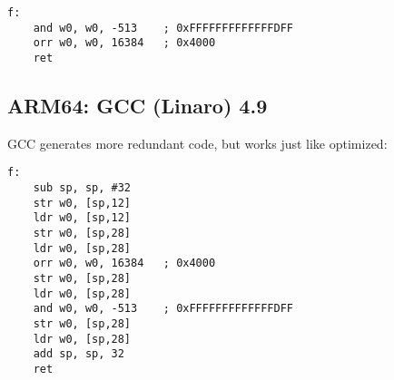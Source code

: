 \begin{lstlisting}[caption=\Optimizing GCC (Linaro) 4.9]
f:
	and	w0, w0, -513	; 0xFFFFFFFFFFFFFDFF
	orr	w0, w0, 16384	; 0x4000
	ret
\end{lstlisting}

\subsection{ARM64: \NonOptimizing GCC (Linaro) 4.9}

\NonOptimizing GCC generates more redundant code, but works just like optimized:

\begin{lstlisting}[caption=\NonOptimizing GCC (Linaro) 4.9]
f:
	sub	sp, sp, #32
	str	w0, [sp,12]
	ldr	w0, [sp,12]
	str	w0, [sp,28]
	ldr	w0, [sp,28]
	orr	w0, w0, 16384	; 0x4000
	str	w0, [sp,28]
	ldr	w0, [sp,28]
	and	w0, w0, -513	; 0xFFFFFFFFFFFFFDFF
	str	w0, [sp,28]
	ldr	w0, [sp,28]
	add	sp, sp, 32
	ret
\end{lstlisting}
